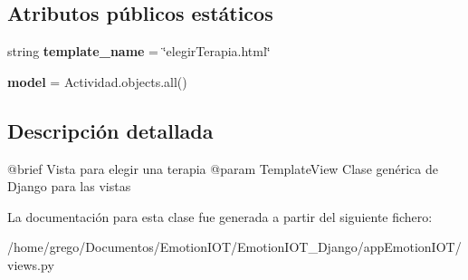\subsection*{Atributos públicos estáticos}
\begin{DoxyCompactItemize}
\item 
string {\bfseries template\+\_\+name} = \char`\"{}elegir\+Terapia.\+html\char`\"{}\hypertarget{classappEmotionIOT_1_1views_1_1ElegirTerapia_adb6bb56e3d9a84ff862be07541c0e410}{}\label{classappEmotionIOT_1_1views_1_1ElegirTerapia_adb6bb56e3d9a84ff862be07541c0e410}

\item 
{\bfseries model} = Actividad.\+objects.\+all()\hypertarget{classappEmotionIOT_1_1views_1_1ElegirTerapia_afd32e2cbaa8ded7b22459f5e475941c6}{}\label{classappEmotionIOT_1_1views_1_1ElegirTerapia_afd32e2cbaa8ded7b22459f5e475941c6}

\end{DoxyCompactItemize}


\subsection{Descripción detallada}
\begin{DoxyVerb}@brief Vista para elegir una terapia
@param TemplateView Clase genérica de Django para las vistas
\end{DoxyVerb}
 

La documentación para esta clase fue generada a partir del siguiente fichero\+:\begin{DoxyCompactItemize}
\item 
/home/grego/\+Documentos/\+Emotion\+I\+O\+T/\+Emotion\+I\+O\+T\+\_\+\+Django/app\+Emotion\+I\+O\+T/views.\+py\end{DoxyCompactItemize}
